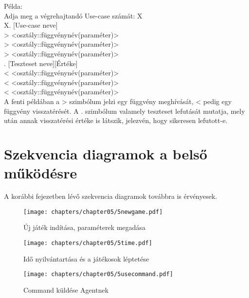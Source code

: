 Példa: \\

Adja meg a végrehajtandó Use-case számát: X \\
X. [Use-case neve] \\
>   <osztály::függvénynév(paraméter)> \\
>         <osztály::függvénynév(paraméter)> \\
>               <osztály::függvénynév(paraméter)> \\
.                    [Teszteset neve][Értéke] \\
<               <osztály::függvénynév(paraméter)> \\
<         <osztály::függvénynév(paraméter)> \\
<   <osztály::függvénynév(paraméter)> \\

A fenti példában a > szimbólum jelzi egy függvény meghívását, < pedig egy függvény
visszatérését. A . szimbólum valamely teszteset lefutását mutatja, mely után annak 
visszatérési értéke is látszik, jelezvén, hogy sikeresen lefutott-e. \\


\clearpage
\section{Szekvencia diagramok a belső működésre}

A korábbi fejezetben lévő szekvencia diagramok továbbra is érvényesek.

\begin{figure}[h]
	\begin{center}
		\texttt{[image: chapters/chapter05/5newgame.pdf]}
		\caption{Új játék indítása, paraméterek megadása}
		\label{fig:5newgame}
	\end{center}
\end{figure}


\begin{figure}[h]
	\begin{center}
		\texttt{[image: chapters/chapter05/5time.pdf]}
		\caption{Idő nyilvántartása és a játékosok léptetése}
		\label{fig:5time}
	\end{center}
\end{figure}
\clearpage

\begin{figure}[h]
    \begin{center}
        \texttt{[image: chapters/chapter05/5usecommand.pdf]}
        \caption{Command küldése Agentnek}
        \label{fig:5usecommand}
    \end{center}
\end{figure}
\clearpage

